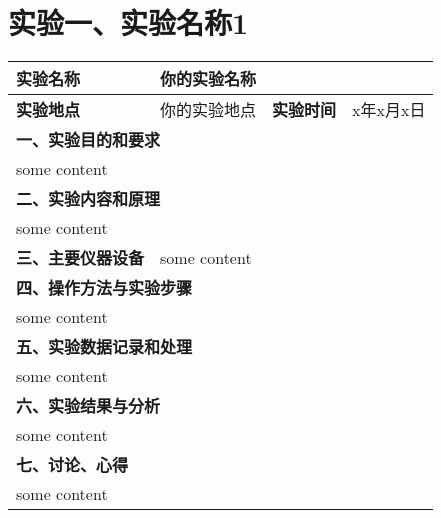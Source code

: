 \documentclass{article}
\begin{document}
\centering
\section{实验一、实验名称1}
\begin{table}[htbp]
\centering
\begin{tabular}{|l|l|l|l|}
\hline
\textbf{实验名称} & \multicolumn{3}{l|}{你的实验名称}\\
\hline
\textbf{实验地点} & 你的实验地点 & \textbf{实验时间} & x年x月x日\\
\hline
\multicolumn{4}{|l|}{\textbf{一、实验目的和要求}} \\
\hline
\multicolumn{4}{|l|}{some content}\\
\hline
\multicolumn{4}{|l|}{\textbf{二、实验内容和原理}} \\
\hline
\multicolumn{4}{|l|}{some content}\\
\hline
\textbf{三、主要仪器设备} & \multicolumn{3}{l|}{some content}\\
\hline
\multicolumn{4}{|l|}{\textbf{四、操作方法与实验步骤}} \\
\hline
\multicolumn{4}{|l|}{some content}\\
\hline
\multicolumn{4}{|l|}{\textbf{五、实验数据记录和处理}}\\
\hline
\multicolumn{4}{|l|}{some content}\\
\hline
\multicolumn{4}{|l|}{\textbf{六、实验结果与分析}}\\
\hline
\multicolumn{4}{|l|}{some content}\\
\hline
\multicolumn{4}{|l|}{\textbf{七、讨论、心得}}\\
\hline
\multicolumn{4}{|l|}{some content}\\
\hline
\end{tabular}
\end{table}
\end{document}
